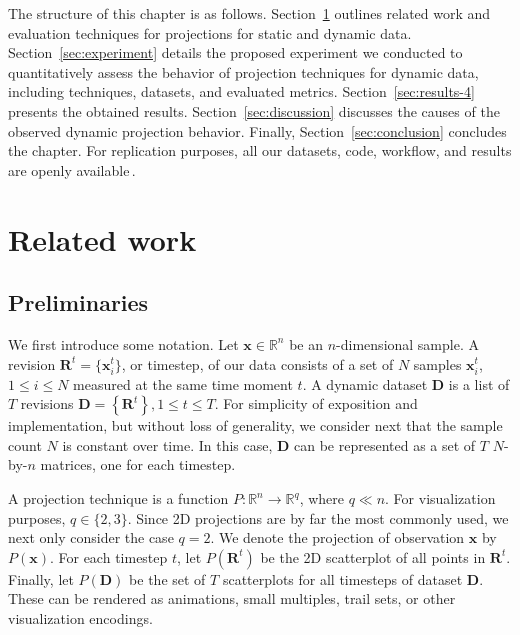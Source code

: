 The structure of this chapter is as follows. Section~\ref{sec:related} outlines related work and evaluation techniques for projections for static and dynamic data. Section~\ref{sec:experiment} details the proposed experiment we conducted to quantitatively assess the behavior of projection techniques for dynamic data, including techniques, datasets, and evaluated metrics. Section~\ref{sec:results-4} presents the obtained results. Section~\ref{sec:discussion} discusses the causes of the observed dynamic projection behavior. Finally, Section~\ref{sec:conclusion} concludes the chapter. For replication purposes, all our datasets, code, workflow, and results are openly available\,\citep{repo}.


\section{Related work}
\label{sec:related}

\subsection{Preliminaries}
\label{sec:preliminaries}
%
We first introduce some notation. Let
$\mathbf{x} \in \mathbb{R}^n$
be an $n$-dimensional sample. A revision $\mathbf{R}^t = \{\mathbf{x}_i^t\}$, or timestep, of our data consists of a set of $N$ samples $\mathbf{x}_i^t$, $1 \leq i \leq N$ measured at the same time moment $t$. A dynamic dataset $\mathbf{D}$ is a list of $T$ revisions $\mathbf{D}=\left \{ \mathbf{R}^{t} \right \}, 1 \leq t \leq T$. For simplicity of exposition and implementation, but without loss of generality, we consider next that the sample count $N$ is constant over time. In this case, $\mathbf{D}$ can be represented as a set of $T$ $N$-by-$n$ matrices, one for each timestep.

A projection technique is a function $P: \mathbb{R}^{n} \rightarrow \mathbb{R}^{q}$, where $q \ll n$. For visualization purposes, $q \in \{2,3\}$. Since 2D projections are by far the most commonly used, we next only consider the case $q=2$. We denote the projection of observation $\mathbf{x}$ by $P(\mathbf{x})$. For each timestep $t$, let $P(\mathbf{R}^{t})$ be the 2D scatterplot of all points in
$\mathbf{R}^{t}$. Finally, let $P(\mathbf{D})$ be the set of $T$ scatterplots for all timesteps of dataset $\mathbf{D}$. These can be rendered as animations, small multiples, trail sets, or other visualization encodings.

